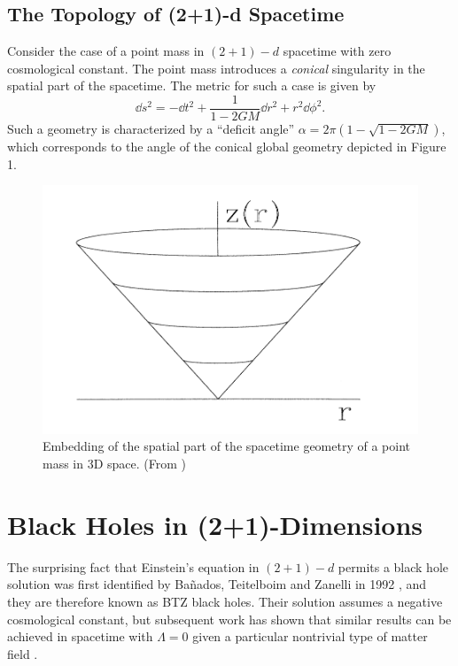 \documentclass[12pt]{article}
\begin{document}
\subsection{The Topology of (2+1)-d Spacetime}
Consider the case of a point mass in $(2+1)-d$ spacetime with zero cosmological constant. The point mass introduces a \textit{conical} singularity in the spatial part of the spacetime. The metric for such a case is given by \cite{cornish}
\begin{equation}
    \dd s^2 = -\dd t^2 + \frac{1}{1-2GM}\dd r^2 + r^2 \dd\phi^2.
\end{equation}
Such a geometry is characterized by a ``deficit angle'' $\alpha = 2\pi\left(1 - \sqrt{1 - 2GM}\right)$, which corresponds to the angle of the conical global geometry depicted in Figure 1.
\begin{figure}[h]
    \includegraphics[scale=0.7]{cone1.PNG}
    \centering
    \caption{Embedding of the spatial part of the spacetime geometry of a point mass in 3D space. (From \cite{2})}
    \label{fig1}
\end{figure}

\section{Black Holes in (2+1)-Dimensions}
The surprising fact that Einstein's equation in $(2+1)-d$ permits a black hole solution was first identified by Ba{\~n}ados, Teitelboim and Zanelli in 1992 \cite{banados92}, and they are therefore known as BTZ black holes. Their solution assumes a negative cosmological constant, but subsequent work has shown that similar results can be achieved in spacetime with $\Lambda=0$ given a particular nontrivial type of matter field \cite{chan}.
\end{document}
